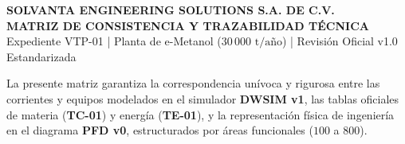 \documentclass[11pt,letterpaper]{article}
\begin{document}
\begin{center}
{\large \textbf{SOLVANTA ENGINEERING SOLUTIONS S.A. DE C.V.}}\\[0.2cm]
{\Large \textbf{\color{navyblue} MATRIZ DE CONSISTENCIA Y TRAZABILIDAD TÉCNICA}}\\[0.1cm]
{\small Expediente VTP-01 | Planta de e-Metanol ($30\,000\text{ t/año}$) | Revisión Oficial v1.0 Estandarizada}
\end{center}

\vspace{0.2cm}
\noindent La presente matriz garantiza la correspondencia unívoca y rigurosa entre las corrientes y equipos modelados en el simulador \textbf{DWSIM v1}, las tablas oficiales de materia (\textbf{TC-01}) y energía (\textbf{TE-01}), y la representación física de ingeniería en el diagrama \textbf{PFD v0}, estructurados por áreas funcionales ($100$ a $800$).
\end{document}
